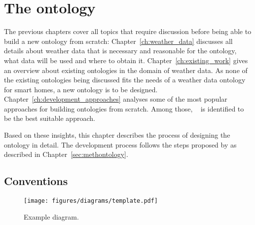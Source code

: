 \chapter{The \smarthomeweather ontology}
\label{ch:smarthomeweather_ontology}

The previous chapters cover all topics that require discussion before being able to build a new ontology from scratch: Chapter~\ref{ch:weather_data} discusses all details about weather data that is necessary and reasonable for the \smarthomeweather ontology, what data will be used and where to obtain it. Chapter~\ref{ch:existing_work} gives an overview about existing ontologies in the domain of weather data. As none of the existing ontologies being discussed fits the needs of a weather data ontology for smart homes, a new ontology is to be designed. Chapter~\ref{ch:development_approaches} analyses some of the most popular approaches for building ontologies from scratch. Among those, \methontology~\cite{Methontology} is identified to be the best suitable approach.

Based on these insights, this chapter describes the process of designing the \smarthomeweather ontology in detail. The development process follows the steps proposed by \methontology as described in Chapter~\ref{sec:methontology}.

\section{Conventions}
\label{sec:ontology_conventions}

\begin{figure}
  \texttt{[image: figures/diagrams/template.pdf]}
  \caption[Example diagram]{Example diagram.}
  \label{fig:diagram_example}
\end{figure}



